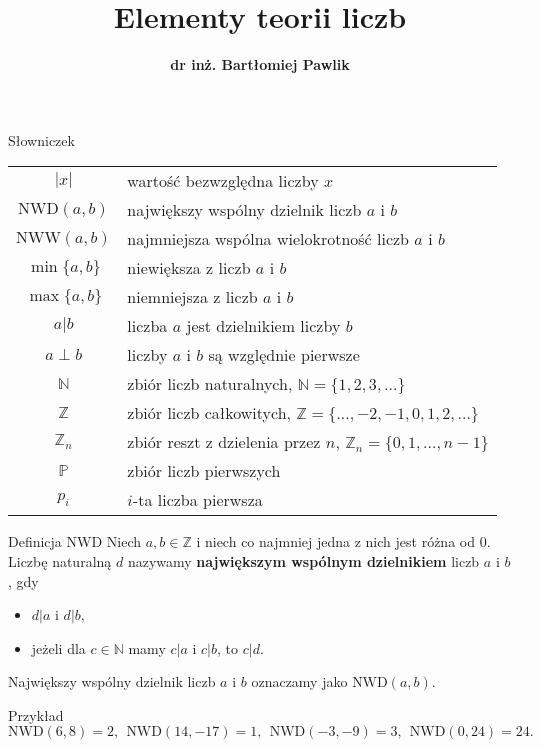 \documentclass[a4paper,10pt]{beamer}
\title{\bf Elementy teorii liczb}
\author[B. Pawlik]{\bf dr inż. Bartłomiej Pawlik}
\begin{document}
\begin{frame}
\titlepage
\end{frame}






\begin{frame}{Słowniczek}
	
	\begin{tabular}{cl}
		$|x|$&wartość bezwzględna liczby $x$\\
		$\mbox{NWD}(a,b)$&największy wspólny dzielnik liczb $a$ i $b$\\
		$\mbox{NWW}(a,b)$&najmniejsza wspólna wielokrotność liczb $a$ i $b$\\
		$\min\{a,b\}$&niewiększa z liczb $a$ i $b$\\
		$\max\{a,b\}$&niemniejsza z liczb $a$ i $b$\\
		$a|b$&liczba $a$ jest dzielnikiem liczby $b$\\
		$a\perp b$&liczby $a$ i $b$ są względnie pierwsze\\
		$\mathbb{N}$&zbiór liczb naturalnych, $\mathbb{N}=\{1,2,3,\ldots\}$\\	
		$\mathbb{Z}$&zbiór liczb całkowitych, $\mathbb{Z}=\{\ldots,-2,-1,0,1,2,\ldots\}$\\
		$\mathbb{Z}_n$&zbiór reszt z dzielenia przez $n$, $\mathbb{Z}_n=\{0,1,\ldots,n-1\}$\\
		$\mathbb{P}$&zbiór liczb pierwszych	\\
		$p_i$&$i$-ta liczba pierwsza
	\end{tabular}
	
\end{frame}





\begin{frame}
	
	\begin{block}{Definicja NWD}
		Niech $a,b\in\mathbb{Z}$ i niech co najmniej jedna z nich jest różna od $0$. Liczbę naturalną $d$ nazywamy {\bf największym wspólnym dzielnikiem} liczb $a$ i $b$, gdy
		\begin{itemize}
			\item $d|a$ i $d|b$,
			\item jeżeli dla $c\in\mathbb{N}$ mamy $c|a$ i $c|b$, to $c|d$.
		\end{itemize}
	\end{block}

Największy wspólny dzielnik liczb $a$ i $b$ oznaczamy jako $\mbox{NWD}(a,b)$.

	\begin{exampleblock}{Przykład}
		$\mbox{NWD}(6,8)=2,\ \ \mbox{NWD}(14,-17)=1,\ \ \mbox{NWD}(-3,-9)=3,\ \ \mbox{NWD}(0,24)=24.$
	\end{exampleblock}
	
\end{frame}
\end{document}
